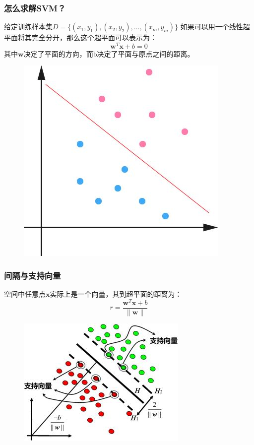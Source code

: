 \begin{frame}
\frametitle{怎么求解SVM？}
给定训练样本集$D = \{(x_1,y_1),(x_2,y_2),\dots,(x_m,y_m)\}$
 如果可以用一个线性超平面将其完全分开，那么这个超平面可以表示为：
\[\boldsymbol{w}^T\boldsymbol{x}+b=0\]
 其中$\boldsymbol{w}$决定了平面的方向，而b决定了平面与原点之间的距离。
           
	\begin{figure}[ht]
	\centering
	\includegraphics[width=0.5\linewidth]{partition/img/svm_10.jpg}  
	\end{figure}

\end{frame} 

\begin{frame}
\frametitle{间隔与支持向量}
空间中任意点$\boldsymbol{x}$实际上是一个向量，其到超平面的距离为：
\[r=\frac{\boldsymbol{w}^T\boldsymbol{x}+b}{\|\boldsymbol{w}\|}\]
	\begin{figure}[ht]
	\centering
	\includegraphics[width=0.5\linewidth]{partition/img/svm_11.jpg}  
	\end{figure}
\end{frame}

